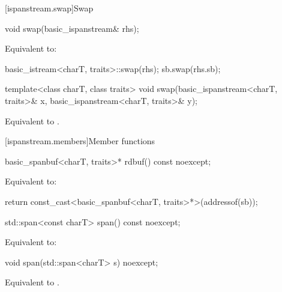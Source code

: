 [ispanstream.swap]{Swap}

%
\begin{itemdecl}
void swap(basic_ispanstream& rhs);
\end{itemdecl}

\begin{itemdescr}
\pnum
\effects
Equivalent to:
\begin{codeblock}
basic_istream<charT, traits>::swap(rhs);
sb.swap(rhs.sb);
\end{codeblock}
\end{itemdescr}

%
\begin{itemdecl}
template<class charT, class traits>
  void swap(basic_ispanstream<charT, traits>& x, basic_ispanstream<charT, traits>& y);
\end{itemdecl}

\begin{itemdescr}
\pnum
\effects
Equivalent to  .
\end{itemdescr}

[ispanstream.members]{Member functions}

%
\begin{itemdecl}
basic_spanbuf<charT, traits>* rdbuf() const noexcept;
\end{itemdecl}

\begin{itemdescr}
\pnum
\effects
Equivalent to:
\begin{codeblock}
return const_cast<basic_spanbuf<charT, traits>*>(addressof(sb));
\end{codeblock}
\end{itemdescr}

%
\begin{itemdecl}
std::span<const charT> span() const noexcept;
\end{itemdecl}

\begin{itemdescr}
\pnum
\effects
Equivalent to: 
\end{itemdescr}

%
\begin{itemdecl}
void span(std::span<charT> s) noexcept;
\end{itemdecl}

\begin{itemdescr}
\pnum
\effects
Equivalent to .
\end{itemdescr}

